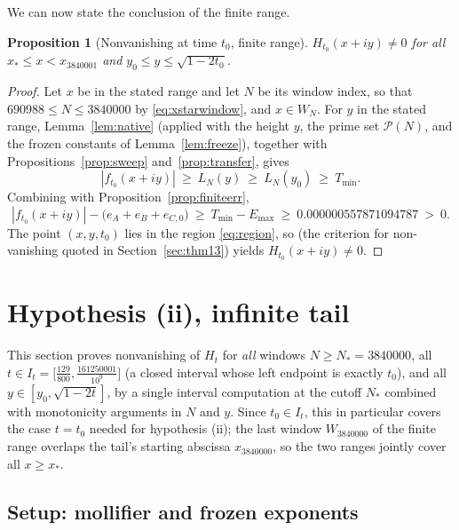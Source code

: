 \documentclass[11pt]{article}
\newtheorem{proposition}[theorem]{Proposition}
\theoremstyle{definition}
\newcommand{\calP}{\mathcal{P}}
\begin{document}
We can now state the conclusion of the finite range.

\begin{proposition}[Nonvanishing at time $t_0$, finite range]
\label{prop:finitelane}
$H_{t_0}(x+iy)\neq0$ for all $x_*\le x<x_{3840001}$ and
$y_0\le y\le\sqrt{1-2t_0}$.
\end{proposition}

\begin{proof}
Let $x$ be in the stated range and let $N$ be its window index, so
that $690988\le N\le3840000$ by \eqref{eq:xstarwindow}, and
$x\in W_N$. For $y$ in the stated range, Lemma~\ref{lem:native}
(applied with the height $y$, the prime set $\calP(N)$, and the
frozen constants of Lemma~\ref{lem:freeze}), together with
Propositions~\ref{prop:sweep} and~\ref{prop:transfer}, gives
\[
|f_{t_0}(x+iy)|\ \ge\ L_N(y)\ \ge\ L_N(y_0)\ \ge\ T_{\min}.
\]
Combining with Proposition~\ref{prop:finiteerr},
\begin{equation}\label{eq:finitemargin}
|f_{t_0}(x+iy)|-\bigl(e_A+e_B+e_{C,0}\bigr)
\ \ge\ T_{\min}-E_{\max}
\ \ge\ 0.000000557871094787\ >\ 0 .
\end{equation}
The point $(x,y,t_0)$ lies in the region \eqref{eq:region}, so
\cite[Corollary~1.4]{Polymath} (the criterion for non-vanishing
quoted in Section~\ref{sec:thm13}) yields
$H_{t_0}(x+iy)\neq0$.
\end{proof}

\section{Hypothesis (ii), infinite tail}\label{sec:tail}

This section proves nonvanishing of $H_t$ for \emph{all} windows
$N\ge N_*=3840000$, all
$t\in I_t=\bigl[\frac{129}{800},\frac{161250001}{10^9}\bigr]$ (a
closed interval whose left endpoint is exactly $t_0$), and all
$y\in[y_0,\sqrt{1-2t}]$, by a single interval computation at the
cutoff $N_*$ combined with monotonicity arguments in $N$ and $y$.
Since $t_0\in I_t$, this in particular covers the case $t=t_0$
needed for hypothesis (ii); the last window $W_{3840000}$ of the
finite range overlaps the tail's starting abscissa $x_{3840000}$, so
the two ranges jointly cover all $x\ge x_*$.

\subsection{Setup: mollifier and frozen exponents}
\end{document}
